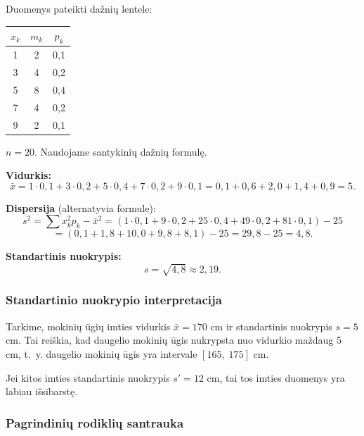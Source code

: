 \begin{example}
Duomenys pateikti dažnių lentele:

\begin{center}
\begin{tabular}{|c|c|c|}
\hline
$x_k$ & $m_k$ & $p_k$ \\
\hline
1 & 2 & 0,1 \\
3 & 4 & 0,2 \\
5 & 8 & 0,4 \\
7 & 4 & 0,2 \\
9 & 2 & 0,1 \\
\hline
\end{tabular}
\end{center}

$n = 20$. Naudojame santykinių dažnių formulę.

\textbf{Vidurkis:}
\[
  \bar{x} = 1\cdot0{,}1 + 3\cdot0{,}2 + 5\cdot0{,}4 + 7\cdot0{,}2 + 9\cdot0{,}1
          = 0{,}1 + 0{,}6 + 2{,}0 + 1{,}4 + 0{,}9 = 5.
\]

\textbf{Dispersija} (alternatyvia formule):
\[
  s^2 = \sum x_k^2 p_k - \bar{x}^2
      = (1\cdot0{,}1 + 9\cdot0{,}2 + 25\cdot0{,}4 + 49\cdot0{,}2 + 81\cdot0{,}1) - 25
\]
\[
      = (0{,}1 + 1{,}8 + 10{,}0 + 9{,}8 + 8{,}1) - 25
      = 29{,}8 - 25 = 4{,}8.
\]

\textbf{Standartinis nuokrypis:}
\[
  s = \sqrt{4{,}8} \approx 2{,}19.
\]
\end{example}

\subsubsection*{Standartinio nuokrypio interpretacija}

\begin{tcolorbox}[colback=yellow!5!white, colframe=orange!80!black,
  title=Praktinė interpretacija]
Tarkime, mokinių ūgių imties vidurkis $\bar{x} = 170$ cm ir standartinis nuokrypis
$s = 5$ cm. Tai reiškia, kad daugelio mokinių ūgis nukrypsta nuo vidurkio maždaug
5 cm, t.~y. daugelio mokinių ūgis yra intervale $[165,\; 175]$ cm.

Jei kitos imties standartinis nuokrypis $s' = 12$ cm, tai tos imties duomenys yra
labiau išsibarstę.
\end{tcolorbox}

\subsubsection*{Pagrindinių rodiklių santrauka}

